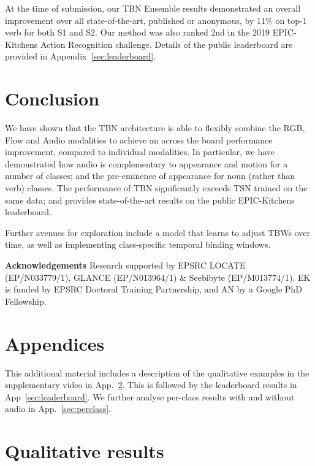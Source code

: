 \documentclass[10pt,twocolumn,letterpaper]{article}
\begin{document}
At the time of submission, our TBN Ensemble results demonstrated an overall improvement over all state-of-the-art, published or anonymous, by 11\% on top-1 verb for both S1 and S2. Our method was also ranked 2nd in the 2019 EPIC-Kitchens Action Recognition challenge. Details of the public leaderboard are provided in Appendix~\ref{sec:leaderboard}.


\section{Conclusion}
We have shown that the TBN architecture is able to flexibly combine the RGB, Flow and Audio modalities to achieve an across the board performance improvement, compared to individual modalities. In particular, we have demonstrated how audio is complementary to appearance and motion for a number of classes; and the pre-eminence of appearance for noun (rather than verb) classes.
The performance of TBN significantly exceeds TSN trained on the same data; and provides state-of-the-art results on the public EPIC-Kitchens leaderboard.

Further avenues for exploration include a model that learns to adjust TBWs over time, as well as implementing class-specific temporal binding windows. 

\vspace{2pt}
\noindent \textbf{Acknowledgements} \hspace{4pt} Research supported by EPSRC LOCATE (EP/N033779/1), GLANCE (EP/N013964/1) \& Seebibyte (EP/M013774/1). EK is funded by EPSRC Doctoral Training Partnership, and AN by a Google PhD Fellowship.  


{\small


}

\clearpage
\appendix
\section*{Appendices}

This additional material includes a description of the qualitative examples in the supplementary video in App.~\ref{sec:qual}. This is followed by the leaderboard results  in App~\ref{sec:leaderboard}. We further analyse per-class results with and without audio in App.~\ref{sec:perclass}.

\section{Qualitative results}
\label{sec:qual}
\end{document}
